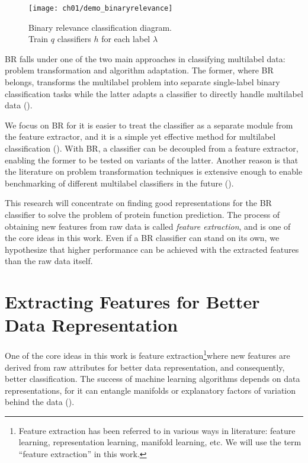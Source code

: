 \begin{figure}[!h]
  \centering
  \texttt{[image: ch01/demo\_binaryrelevance]}
  \caption[Binary relevance classification diagram]
  {Binary relevance classification diagram.\\Train $q$ classifiers $h$ for each
  label $\lambda$}
  \label{demo:binaryrelevance}
\end{figure}

\par BR falls under one of the two main approaches in classifying multilabel data:
problem transformation and algorithm adaptation. The former, where BR
belongs, transforms the multilabel problem into separate single-label binary
classification tasks while the latter adapts a classifier to directly handle
multilabel data (\cite{tsoumakas2007multilabel}).

\par We focus on BR for it is easier to treat the classifier as a separate
module from the feature extractor, and it is a simple yet effective method
for multilabel classification (\cite{luaces2012binary}). With BR, a
classifier can be decoupled from a feature extractor, enabling the former to
be tested on variants of the latter. Another reason is that the literature on
problem transformation techniques is extensive enough to enable benchmarking
of different multilabel classifiers in the future (\cite{zhang2014review,
madjarov2012extensive}).

\par This research will concentrate on finding good representations for the
BR classifier to solve the problem of protein function prediction. The
process of obtaining new features from raw data is called \textit{feature
extraction}, and is one of the core ideas in this work. Even if a BR
classifier can stand on its own, we hypothesize that higher performance can
be achieved with the extracted features than the raw data itself.

\section{Extracting Features for Better Data Representation}
\label{FeatureExtraction}

\par One of the core ideas in this work is feature extraction\footnote{
  Feature extraction has been referred to in various ways in literature:
  feature learning, representation learning, manifold learning, etc. We will
  use the term ``feature extraction'' in this work.
}\textemdash where new features are derived from raw attributes for better
data representation, and consequently, better classification. The success of
machine learning algorithms depends on data representations, for it can
entangle manifolds or explanatory factors of variation behind the data
(\cite{bengio2013representation}). 

